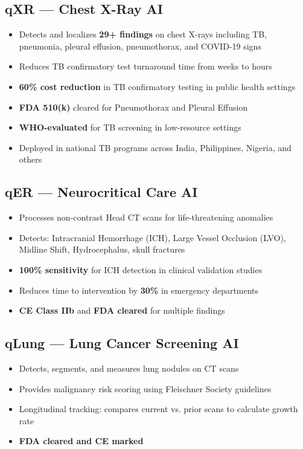 \documentclass[12pt,a4paper]{article}
\begin{document}
\subsection{qXR --- Chest X-Ray AI}
\begin{itemize}[noitemsep]
    \item Detects and localizes \textbf{29+ findings} on chest X-rays including TB, pneumonia, pleural effusion, pneumothorax, and COVID-19 signs
    \item Reduces TB confirmatory test turnaround time from weeks to hours
    \item \textbf{60\% cost reduction} in TB confirmatory testing in public health settings
    \item \textbf{FDA 510(k)} cleared for Pneumothorax and Pleural Effusion
    \item \textbf{WHO-evaluated} for TB screening in low-resource settings
    \item Deployed in national TB programs across India, Philippines, Nigeria, and others
\end{itemize}

\subsection{qER --- Neurocritical Care AI}
\begin{itemize}[noitemsep]
    \item Processes non-contrast Head CT scans for life-threatening anomalies
    \item Detects: Intracranial Hemorrhage (ICH), Large Vessel Occlusion (LVO), Midline Shift, Hydrocephalus, skull fractures
    \item \textbf{100\% sensitivity} for ICH detection in clinical validation studies
    \item Reduces time to intervention by \textbf{30\%} in emergency departments
    \item \textbf{CE Class IIb} and \textbf{FDA cleared} for multiple findings
\end{itemize}

\subsection{qLung --- Lung Cancer Screening AI}
\begin{itemize}[noitemsep]
    \item Detects, segments, and measures lung nodules on CT scans
    \item Provides malignancy risk scoring using Fleischner Society guidelines
    \item Longitudinal tracking: compares current vs. prior scans to calculate growth rate
    \item \textbf{FDA cleared and CE marked}
\end{itemize}
\end{document}
